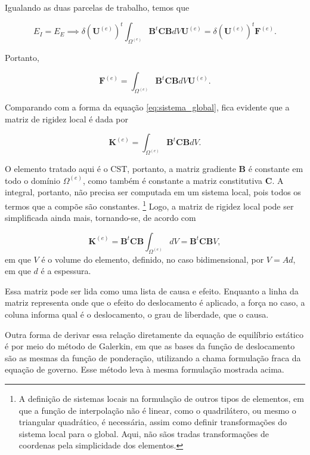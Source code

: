 Igualando as duas parcelas de trabalho, temos que

\begin{equation}
    E_I = E_E \implies
    \delta (\bm{U}^{(e)})^t \int_{\Omega^{(e)}} \bm{B}^t \bm{C} \bm{B} dV \bm{U}^{(e)} = \delta (\bm{U}^{(e)})^t \bm{F}^{(e)}.
\end{equation}

Portanto, 

\begin{equation}
    \bm{F}^{(e)} = \int_{\Omega^{(e)}} \bm{B}^t \bm{C} \bm{B} dV \bm{U}^{(e)}.
    \label{eq:forca_equivalente}
\end{equation}

Comparando com a forma da equação \ref{eq:sistema_global}, fica evidente que a matriz de rigidez local é dada por

\begin{equation}
    \bm{K}^{(e)} = \int_{\Omega^{(e)}} \bm{B}^t \bm{C} \bm{B} dV.
\end{equation}

O elemento tratado aqui é o CST, portanto, a matriz gradiente $\bm{B}$ é constante em todo o domínio $\Omega^{(e)}$, como também é constante a matriz constitutiva $\bm{C}$. A integral, portanto, não precisa ser computada em um sistema local, pois todos os termos que a compõe são constantes. \footnote{A definição de sistemas locais na formulação de outros tipos de elementos, em que a função de interpolação não é linear, como o quadrilátero, ou mesmo o triangular quadrático, é necessária, assim como definir transformações do sistema local para o global. Aqui, não sãos tradas transformações de coordenas pela simplicidade dos elementos.} Logo, a matriz de rigidez local pode ser simplificada ainda mais, tornando-se, de acordo com 

\begin{equation}
    \bm{K}^{(e)} = \bm{B}^t \bm{C} \bm{B} \int_{\Omega^{(e)}} dV = \bm{B}^t \bm{C} \bm{B} V,
\end{equation}
em que $V$ é o volume do elemento, definido, no caso bidimensional, por $V = A d$, em que $d$ é a espessura.

Essa matriz pode ser lida como uma lista de causa e efeito. Enquanto a linha da matriz representa onde que o efeito do deslocamento é aplicado, a força no caso, a coluna informa qual é o deslocamento, o grau de liberdade, que o causa. \cite{LOGAN}

Outra forma de derivar essa relação diretamente da equação de equilíbrio estático é por meio do método de Galerkin, em que as bases da função de deslocamento são as mesmas da função de ponderação, utilizando a chama formulação fraca da equação de governo. Esse método leva à mesma formulação mostrada acima.

